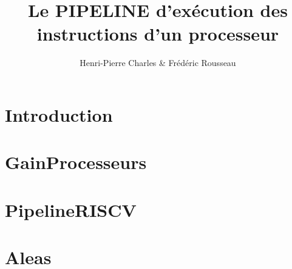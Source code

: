 \documentclass[aspectratio=169]{beamer}
\title{Le PIPELINE d'exécution des instructions d'un processeur}
\author{Henri-Pierre Charles \& Frédéric Rousseau}
\date{}
\newcommand{\Slide}[1]{}
\begin{document}
\begin{frame}
\titlepage
\end{frame}


\begin{frame}
\tableofcontents[
]
\end{frame}


\section{Introduction}
\Slide{Introduction/SlideIntro}
\Slide{Introduction/PrincipeAlgoProcesseur}
\Slide{Introduction/Principe}
\Slide{Introduction/AnalogieSansPipeline}
\Slide{Introduction/AnalogieAvecPipeline}
\Slide{Introduction/PerfLaverie}

\section{GainProcesseurs}
\Slide{GainProcesseurs/Interet1}
\Slide{GainProcesseurs/Interet2}
\Slide{GainProcesseurs/Interet3}

\section{PipelineRISCV}
\Slide{PipelineRISCV/ArchiRISCV1}
\Slide{PipelineRISCV/ArchiRISCV2}
\Slide{PipelineRISCV/ArchiRISCV3}
\Slide{PipelineRISCV/ArchiRISCV4}
\Slide{PipelineRISCV/ArchiRISCV5}
\Slide{PipelineRISCV/ArchiRISCV6}
\Slide{PipelineRISCV/ArchiRISCV7}
\Slide{PipelineRISCV/ArchiRISCV8}

\section{Aleas}
\Slide{Aleas/PrincipeAleas}
\Slide{Aleas/ListeAleas}
\Slide{Aleas/AleasDonnees1}
\Slide{Aleas/AleasDonnees2}
\Slide{Aleas/AleasDonnees3}
\Slide{Aleas/AleasDonnees4}
\Slide{Aleas/AleasDonnees5}

\Slide{Aleas/AleasBranch1}
\Slide{Aleas/AleasBranch2}
\Slide{Aleas/AleasBranch3}
\Slide{Aleas/ExempleCodeNop}
\Slide{Aleas/AleasITExc1}

\Slide{Conclusion/Conclusion}
\Slide{Conclusion/ExerciceTD}
\end{document}
